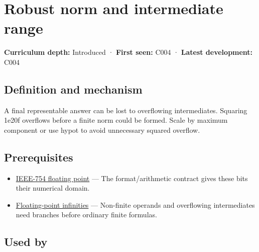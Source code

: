 \hypertarget{appendix-7f1e17dcafb1}{}\label{referencestart:appendix-7f1e17dcafb1}
\section{Robust norm and intermediate range}\label{appendix-7f1e17dcafb1-robust-norm-and-intermediate-range}

\hypertarget{appendix-7f1e17dcafb1-robust-norm-and-intermediate-range}{}

\textbf{Curriculum depth:} Introduced · \textbf{First seen:} C004 · \textbf{Latest development:} C004

\begin{allmightroledefinition}

\subsection{Definition and mechanism}\label{appendix-7f1e17dcafb1-definition-and-mechanism}

\hypertarget{appendix-7f1e17dcafb1-definition-and-mechanism}{}

A final representable answer can be lost to overflowing intermediates. Squaring 1e20f overflows before a finite norm could be formed. Scale by maximum component or use hypot to avoid unnecessary squared overflow.

\end{allmightroledefinition}

\subsection{Prerequisites}\label{appendix-7f1e17dcafb1-prerequisites}

\hypertarget{appendix-7f1e17dcafb1-prerequisites}{}

\begin{itemize}
\tightlist
\item
  \hyperref[appendix-343615f49ddf]{IEEE-754 floating point} --- The format/arithmetic contract gives these bits their numerical domain.
\item
  \hyperref[appendix-eb336149c00a]{Floating-point infinities} --- Non-finite operands and overflowing intermediates need branches before ordinary finite formulas.
\end{itemize}

\subsection{Used by}\label{appendix-7f1e17dcafb1-used-by}


